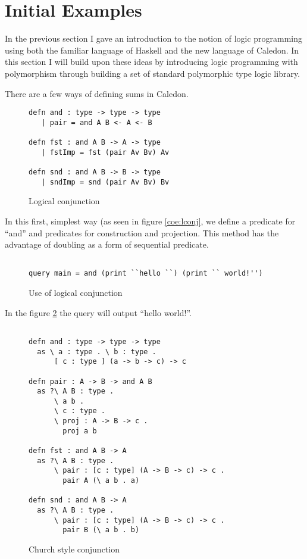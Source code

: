 \section{Initial Examples}


In the previous section I gave an introduction to the notion of logic programming using
both the familiar language of Haskell and the new language of Caledon. In this section
I will build upon these ideas by introducing logic programming with polymorphism
through building a set of standard polymorphic type logic library.

There are a few ways of defining sums in Caledon.


\begin{figure}[H]
\begin{lstlisting}
defn and : type -> type -> type
   | pair = and A B <- A <- B

defn fst : and A B -> A -> type
   | fstImp = fst (pair Av Bv) Av

defn snd : and A B -> B -> type
   | sndImp = snd (pair Av Bv) Bv
\end{lstlisting}
\caption{Logical conjunction}
\label{code:lconj}
\end{figure}


In this first, simplest way (as seen in figure \ref{coe:lconj}, we define a predicate for “and” and
predicates for construction and projection. This method has the advantage of doubling
as a form of sequential predicate.

\begin{figure}[H]
\begin{lstlisting}

query main = and (print ``hello ``) (print `` world!'')
\end{lstlisting}
\caption{Use of logical conjunction}
\label{code:lconjuse}
\end{figure}

In the figure \ref{code:lconjuse} the query will output ``hello world!''.

\begin{figure}[H]
\begin{lstlisting}

defn and : type -> type -> type
  as \ a : type . \ b : type . 
      [ c : type ] (a -> b -> c) -> c

defn pair : A -> B -> and A B
  as ?\ A B : type .
      \ a b .
      \ c : type .
      \ proj : A -> B -> c .
        proj a b

defn fst : and A B -> A
  as ?\ A B : type .
      \ pair : [c : type] (A -> B -> c) -> c .
        pair A (\ a b . a)

defn snd : and A B -> A
  as ?\ A B : type .
      \ pair : [c : type] (A -> B -> c) -> c .
        pair B (\ a b . b)

\end{lstlisting}
\caption{Church style conjunction}
\label{code:cconj}
\end{figure}

